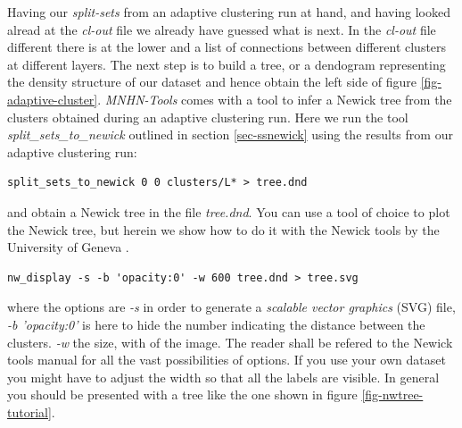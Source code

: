 Having our \emph{split-sets} from an adaptive clustering run at hand,
and having looked alread at the \emph{cl-out} file we already have
guessed what is next. In the \emph{cl-out} file different there is at
the lower and a list of connections between different clusters at
different layers. The next step is to build a tree, or a dendogram
representing the density structure of our dataset and hence obtain the
left side of figure \ref{fig-adaptive-cluster}. \emph{MNHN-Tools} comes
with a tool to infer a Newick tree \cite{newick} from the clusters
obtained during an adaptive clustering run. Here we run the tool
\emph{split\_sets\_to\_newick} outlined in section \ref{sec-ssnewick}
using the results from our adaptive clustering run:
\begin{lstlisting}
split_sets_to_newick 0 0 clusters/L* > tree.dnd
\end{lstlisting}
and obtain a Newick tree in the file \emph{tree.dnd}. You can use a
tool of choice to plot the Newick tree, but herein we show how to do
it with the Newick tools by the University of Geneva
\cite{newick_tools}.
\begin{lstlisting}
nw_display -s -b 'opacity:0' -w 600 tree.dnd > tree.svg
\end{lstlisting}
where the options are \emph{-s} in order to generate a \emph{scalable
vector graphics} (SVG) file, \emph{-b 'opacity:0'} is here to hide the
number indicating the distance between the clusters. \emph{-w} the
size, with of the image. The reader shall be refered to the Newick
tools manual for all the vast possibilities of options. If you use
your own dataset you might have to adjust the width so that all the
labels are visible. In general you should be presented with a tree
like the one shown in figure \ref{fig-nwtree-tutorial}.
